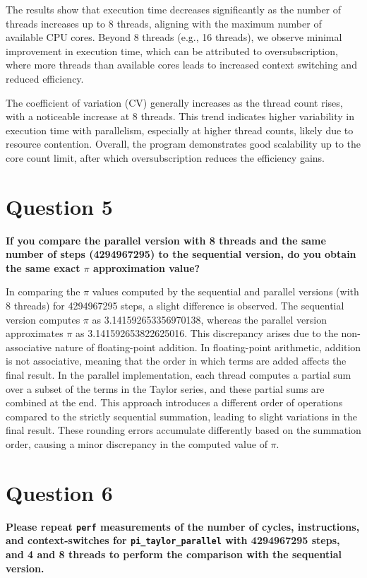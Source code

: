\documentclass{article}
\begin{document}
The results show that execution time decreases significantly as the number of threads increases up to 8 threads, aligning with the maximum number of available CPU cores. Beyond 8 threads (e.g., 16 threads), we observe minimal improvement in execution time, which can be attributed to oversubscription, where more threads than available cores leads to increased context switching and reduced efficiency. 

The coefficient of variation (CV) generally increases as the thread count rises, with a noticeable increase at 8 threads. This trend indicates higher variability in execution time with parallelism, especially at higher thread counts, likely due to resource contention. Overall, the program demonstrates good scalability up to the core count limit, after which oversubscription reduces the efficiency gains.

\section*{Question 5}

\textbf{If you compare the parallel version with 8 threads and the same number of steps (4294967295) to the sequential version, do you obtain the same exact \(\pi\) approximation value?}

In comparing the \(\pi\) values computed by the sequential and parallel versions (with 8 threads) for 4294967295 steps, a slight difference is observed. The sequential version computes \(\pi\) as 3.141592653356970138, whereas the parallel version approximates \(\pi\) as 3.141592653822625016. This discrepancy arises due to the non-associative nature of floating-point addition. In floating-point arithmetic, addition is not associative, meaning that the order in which terms are added affects the final result. In the parallel implementation, each thread computes a partial sum over a subset of the terms in the Taylor series, and these partial sums are combined at the end. This approach introduces a different order of operations compared to the strictly sequential summation, leading to slight variations in the final result. These rounding errors accumulate differently based on the summation order, causing a minor discrepancy in the computed value of \(\pi\).

\section*{Question 6}

\textbf{Please repeat \texttt{perf} measurements of the number of cycles, instructions, and context-switches for \texttt{pi\_taylor\_parallel} with 4294967295 steps, and 4 and 8 threads to perform the comparison with the sequential version.}
\end{document}
